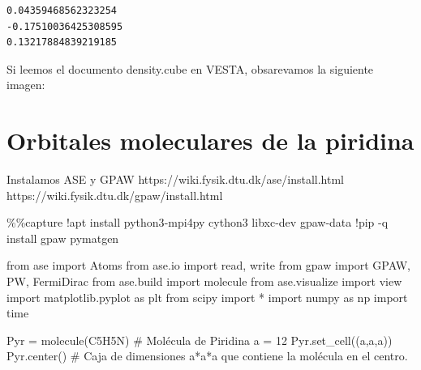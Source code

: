 \documentclass[
  letterpaper,
  DIV=11,
  numbers=noendperiod]{scrreprt}
\newenvironment{Shaded}{\begin{snugshade}}{\end{snugshade}}
\newcommand{\CommentTok}[1]{\textcolor[rgb]{0.37,0.37,0.37}{#1}}
\newcommand{\DecValTok}[1]{\textcolor[rgb]{0.68,0.00,0.00}{#1}}
\newcommand{\ImportTok}[1]{\textcolor[rgb]{0.00,0.46,0.62}{#1}}
\newcommand{\NormalTok}[1]{\textcolor[rgb]{0.00,0.23,0.31}{#1}}
\newcommand{\OperatorTok}[1]{\textcolor[rgb]{0.37,0.37,0.37}{#1}}
\newcommand{\StringTok}[1]{\textcolor[rgb]{0.13,0.47,0.30}{#1}}
\begin{document}
\begin{verbatim}
0.04359468562323254
-0.17510036425308595
0.13217884839219185
\end{verbatim}

Si leemos el documento density.cube en VESTA, obsarevamos la siguiente
imagen:

\hypertarget{orbitales-moleculares-de-la-piridina}{%
\chapter{Orbitales moleculares de la
piridina}\label{orbitales-moleculares-de-la-piridina}}

Instalamos ASE y GPAW https://wiki.fysik.dtu.dk/ase/install.html
https://wiki.fysik.dtu.dk/gpaw/install.html

\begin{Shaded}
\begin{Highlighting}[]
\OperatorTok{\%\%}\NormalTok{capture}
\OperatorTok{!}\NormalTok{apt install python3}\OperatorTok{{-}}\NormalTok{mpi4py cython3 libxc}\OperatorTok{{-}}\NormalTok{dev gpaw}\OperatorTok{{-}}\NormalTok{data}
\OperatorTok{!}\NormalTok{pip }\OperatorTok{{-}}\NormalTok{q install gpaw pymatgen}
\end{Highlighting}
\end{Shaded}

\begin{Shaded}
\begin{Highlighting}[]
\ImportTok{from}\NormalTok{ ase }\ImportTok{import}\NormalTok{ Atoms}
\ImportTok{from}\NormalTok{ ase.io }\ImportTok{import}\NormalTok{ read, write}
\ImportTok{from}\NormalTok{ gpaw }\ImportTok{import}\NormalTok{ GPAW, PW, FermiDirac}
\ImportTok{from}\NormalTok{ ase.build }\ImportTok{import}\NormalTok{ molecule}
\ImportTok{from}\NormalTok{ ase.visualize }\ImportTok{import}\NormalTok{ view}
\ImportTok{import}\NormalTok{ matplotlib.pyplot }\ImportTok{as}\NormalTok{ plt}
\ImportTok{from}\NormalTok{ scipy }\ImportTok{import} \OperatorTok{*}
\ImportTok{import}\NormalTok{ numpy }\ImportTok{as}\NormalTok{ np}
\ImportTok{import}\NormalTok{ time}
\end{Highlighting}
\end{Shaded}

\begin{Shaded}
\begin{Highlighting}[]
\NormalTok{Pyr }\OperatorTok{=}\NormalTok{ molecule(}\StringTok{\textquotesingle{}C5H5N\textquotesingle{}}\NormalTok{)  }\CommentTok{\# Molécula de Piridina}
\NormalTok{a }\OperatorTok{=} \DecValTok{12}
\NormalTok{Pyr.set\_cell((a,a,a))}
\NormalTok{Pyr.center() }\CommentTok{\# Caja de dimensiones a*a*a que contiene la molécula en el centro.}
\end{Highlighting}
\end{Shaded}
\end{document}
